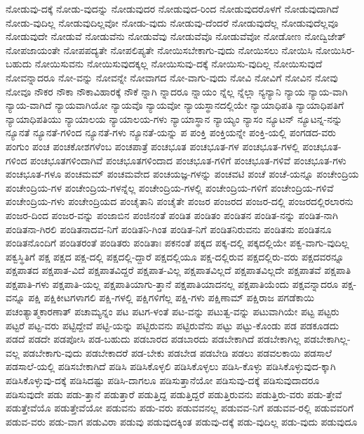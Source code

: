 {ನೋಡುವು-ದಕ್ಕೆ
ನೋಡು-ವುದನ್ನು
ನೋಡುವುದರ
ನೋಡುವುದ-ರಿಂದ
ನೋಡುವುದರೊಳಗೆ
ನೋಡುವುದಾಗಿದೆ
ನೋಡು-ವುದಿಲ್ಲ
ನೋಡುವುದಿಲ್ಲವೋ
ನೋಡು-ವುದು
ನೋಡುವು-ದೆಂದರೆ
ನೋಡುವುದೆಲ್ಲ
ನೋಡುವುದೆಲ್ಲವೂ
ನೋಡುವುದೇ
ನೋಡುವೆ
ನೋಡುವೆನು
ನೋಡುವೆವು
ನೋಡುವೆವೊ
ನೋಡುವೆವೋ
ನೋಡೋಣ
ನೋದ್ವಿಜೇತ್
ನೋಪಜಾಯಂತೇ
ನೋಪಪದ್ಯತೇ
ನೋಪಲಿಪ್ಯತೇ
ನೋಯಿಸಬೇಕಾಗು-ವುದು
ನೋಯಿಸಲು
ನೋಯಿಸಿ
ನೋಯಿಸಿರ-ಬಹುದು
ನೋಯಿಸುವನು
ನೋಯಿಸುವುದಕ್ಕಲ್ಲ
ನೋಯಿಸುವು-ದಕ್ಕೆ
ನೋಯಿಸು-ವುದಿಲ್ಲ
ನೋಯಿಸುವುದೆ
ನೋವನ್ನಾದರೂ
ನೋ-ವನ್ನು
ನೋವನ್ನೇ
ನೋವಾಗದ
ನೋ-ವಾಗು-ವುದು
ನೋವಿ
ನೋವಿಗೆ
ನೋವಿನ
ನೋವು
ನೋವೂ
ನೌಕರ
ನೌಕಾ
ನೌಕಾವಿಹಾರಕ್ಕೆ
ನೌಕೆ
ನ್ನಾಗಿ
ನ್ನಾದರೂ
ನ್ನಾಯಂ
ನ್ನೆಲ್ಲ
ನ್ನೆಲ್ಲಾ
ನ್ಯನ್ಯಾನಿ
ನ್ಯಾಯ
ನ್ಯಾಯ-ವಾಗಿ
ನ್ಯಾಯ-ವಾಗಿದೆ
ನ್ಯಾಯವಾಗಿಯೋ
ನ್ಯಾಯವೊ
ನ್ಯಾಯವೋ
ನ್ಯಾಯಸ್ಥಾನದಲ್ಲಿಯೇ
ನ್ಯಾಯಾಧಿಪತಿ
ನ್ಯಾಯಾಧಿಪತಿಗೆ
ನ್ಯಾಯಾಧಿಪತಿಯು
ನ್ಯಾಯಾಲಯ
ನ್ಯಾಯಾಲಯ-ಗಳು
ನ್ಯಾಯಾಸ್ಥಾನ
ನ್ಯಾಯ್ಯಂ
ನ್ಯಾಸಂ
ನ್ಯೂಟನ್
ನ್ಯೂಟನ್ನ-ನನ್ನು
ನ್ಯೂನತೆ
ನ್ಯೂನತೆ-ಗಳಿಂದ
ನ್ಯೂನತೆ-ಗಳು
ನ್ಯೂನತೆ-ಯನ್ನು
ಪ
ಪಂಕ್ತಿ
ಪಂಕ್ತಿಯನ್ನೇ
ಪಂಕ್ತಿ-ಯಲ್ಲಿ
ಪಂಗಡದ-ವರು
ಪಂಗುಂ
ಪಂಚ
ಪಂಚಕೋಶಗಳೆಂಬ
ಪಂಚಪಾತ್ರೆ
ಪಂಚಭೂತ
ಪಂಚಭೂತ-ಗಳ
ಪಂಚಭೂತ-ಗಳಲ್ಲಿ
ಪಂಚಭೂತ-ಗಳಿಂದ
ಪಂಚಭೂತಗಳಿಂದಾಗಿವೆ
ಪಂಚಭೂತಗಳಿಂದಾದ
ಪಂಚಭೂತ-ಗಳಿಗೆ
ಪಂಚಭೂತ-ಗಳಿವೆ
ಪಂಚಭೂತ-ಗಳು
ಪಂಚಭೂತ-ಗಳೂ
ಪಂಚಮಮ್
ಪಂಚಮವೇದ
ಪಂಚಯಜ್ಞ-ಗಳನ್ನು
ಪಂಚವಟಿ
ಪಂಚೆ
ಪಂಚೆ-ಯನ್ನೂ
ಪಂಚೇಂದ್ರಿಯ
ಪಂಚೇಂದ್ರಿಯ-ಗಳ
ಪಂಚೇಂದ್ರಿಯ-ಗಳನ್ನೆಲ್ಲ
ಪಂಚೇಂದ್ರಿಯ-ಗಳಲ್ಲಿ
ಪಂಚೇಂದ್ರಿಯ-ಗಳಿಗೆ
ಪಂಚೇಂದ್ರಿಯ-ಗಳಿವೆ
ಪಂಚೇಂದ್ರಿಯ-ಗಳು
ಪಂಚೇಂದ್ರಿಯದ
ಪಂಚೈತಾನಿ
ಪಂಚೈತೇ
ಪಂಜರ
ಪಂಜರದ
ಪಂಜರ-ದಲ್ಲಿ
ಪಂಜರದಲ್ಲಿರಲಾರನು
ಪಂಜರ-ದಿಂದ
ಪಂಜರ-ವನ್ನು
ಪಂಜಾಬಿನ
ಪಂಜಿನಂತೆ
ಪಂಡಿತ
ಪಂಡಿತಂ
ಪಂಡಿತನ
ಪಂಡಿತ-ನನ್ನು
ಪಂಡಿತ-ನಾಗಿ
ಪಂಡಿತನಾ-ಗಿರಲಿ
ಪಂಡಿತನಾದವ-ನಿಗೆ
ಪಂಡಿತನಿ-ಗಿಂತ
ಪಂಡಿತ-ನಿಗೆ
ಪಂಡಿತನಿರುವನು
ಪಂಡಿತನು
ಪಂಡಿತನೂ
ಪಂಡಿತನೊಂದಿಗೆ
ಪಂಡಿತರಂತೆ
ಪಂಡಿತರು
ಪಂಡಿತಾಃ
ಪಕನಂತೆ
ಪಕ್ಕದ
ಪಕ್ಕ-ದಲ್ಲಿ
ಪಕ್ಕದಲ್ಲಿಯೇ
ಪಕ್ವ-ವಾಗು-ವುದಿಲ್ಲ
ಪಕ್ವಸ್ಥಿತಿಗೆ
ಪಕ್ಷ
ಪಕ್ಷದ
ಪಕ್ಷ-ದಲ್ಲಿ
ಪಕ್ಷದಲ್ಲಿ-ದ್ದಾರೆ
ಪಕ್ಷದಲ್ಲಿಯೂ
ಪಕ್ಷ-ದಲ್ಲಿರುವ
ಪಕ್ಷದಲ್ಲಿರು-ವರು
ಪಕ್ಷದವರನ್ನೂ
ಪಕ್ಷಪಾತದ
ಪಕ್ಷಪಾತ-ವಿದೆ
ಪಕ್ಷಪಾತವಿದ್ದರೆ
ಪಕ್ಷಪಾತ-ವಿಲ್ಲ
ಪಕ್ಷಪಾತವಿಲ್ಲದೆ
ಪಕ್ಷಪಾತವಿಲ್ಲದೇ
ಪಕ್ಷಪಾತವೆ
ಪಕ್ಷಪಾತಿ
ಪಕ್ಷಪಾತಿ-ಗಳು
ಪಕ್ಷಪಾತಿ-ಯಲ್ಲ
ಪಕ್ಷಪಾತಿಯಾಗು-ತ್ತಾನೆ
ಪಕ್ಷಪಾತಿಯಾದನಲ್ಲ
ಪಕ್ಷಪಾತಿಯೆಂದು
ಪಕ್ಷವನ್ನಾದರೂ
ಪಕ್ಷ-ವನ್ನೂ
ಪಕ್ಷಿ
ಪಕ್ಷಿಕೀಟಗಳಾಗಲಿ
ಪಕ್ಷಿ-ಗಳಲ್ಲಿ
ಪಕ್ಷಿಗಳಿಗೆಲ್ಲ
ಪಕ್ಷಿ-ಗಳು
ಪಕ್ಷಿಣಾಮ್
ಪಕ್ಷಿರಾಜ
ಪಗಡೆಕಾಯಿ
ಪಚಂತ್ಯಾತ್ಮಕಾರಣಾತ್
ಪಚಾಮ್ಯನ್ನಂ
ಪಟ
ಪಟಗ-ಳಂತೆ
ಪಟ-ವನ್ನು
ಪಟುತ್ವ-ವನ್ನು
ಪಟುವಾಗಿಯೇ
ಪಟ್ಟ
ಪಟ್ಟರು
ಪಟ್ಟರೆ
ಪಟ್ಟ-ವರು
ಪಟ್ಟಿದ್ದೇವೆ
ಪಟ್ಟಿ-ಯನ್ನು
ಪಟ್ಟಿರುವನು
ಪಟ್ಟಿರುವೆನು
ಪಟ್ಟು
ಪಟ್ಟು-ಕೊಂಡು
ಪಡ
ಪಡಕೂಡದು
ಪಡದೆ
ಪಡದೇ
ಪಡಪೋಸಿ
ಪಡ-ಬಹುದು
ಪಡಬಾರದ
ಪಡಬಾರದು
ಪಡಬೇಕಾಗಿದೆ
ಪಡಬೇಕಾಗಿಲ್ಲ
ಪಡಬೇಕಾಗಿಲ್ಲ-ವಲ್ಲ
ಪಡಬೇಕಾಗು-ವುದು
ಪಡಬೇಕಾದರೆ
ಪಡ-ಬೇಕು
ಪಡಬೇಡ
ಪಡಬೇಡಿ
ಪಡಲು
ಪಡವಲಕಾಯಿ
ಪಡಸಾಲೆ
ಪಡಸಾಲೆ-ಯಲ್ಲಿ
ಪಡಿಸಬೇಕಾಗಿದೆ
ಪಡಿಸಿ
ಪಡಿಸಿಕೊಳ್ಳಲಿ
ಪಡಿಸಿಕೊಳ್ಳಲು
ಪಡಿಸಿ-ಕೊಳ್ಳು
ಪಡಿಸಿಕೊಳ್ಳುವುದ-ಕ್ಕಾಗಿ
ಪಡಿಸಿಕೊಳ್ಳುವು-ದಕ್ಕೆ
ಪಡಿಸಿದಷ್ಟು
ಪಡಿಸಿ-ದಾಗಲೂ
ಪಡಿಸುತ್ತಾನೆಯೋ
ಪಡಿಸುವು-ದಕ್ಕೆ
ಪಡಿಸುವುದಾದರೂ
ಪಡಿಸುವುದೇ
ಪಡು
ಪಡು-ತ್ತಾನೆ
ಪಡುತ್ತಾರೆ
ಪಡುತ್ತಿದ್ದ
ಪಡುತ್ತಿದ್ದರೆ
ಪಡುತ್ತಿರುವನು
ಪಡುತ್ತಿರು-ವರು
ಪಡು-ತ್ತೇವೆ
ಪಡುತ್ತೇವೆಯೊ
ಪಡುತ್ತೇವೆಯೋ
ಪಡುವನು
ಪಡು-ವರು
ಪಡುವವನಲ್ಲ
ಪಡುವವ-ನಿಗೆ
ಪಡುವವ-ರಲ್ಲಿ
ಪಡುವವರಿಗೆ
ಪಡುವ-ವರು
ಪಡು-ವಾಗ
ಪಡುವಿರಾ
ಪಡುವು
ಪಡುವುದಕ್ಕಿಂತ
ಪಡುವು-ದಕ್ಕೆ
ಪಡು-ವುದಿಲ್ಲ
ಪಡು-ವುದು
ಪಡುವುದೂ
}
